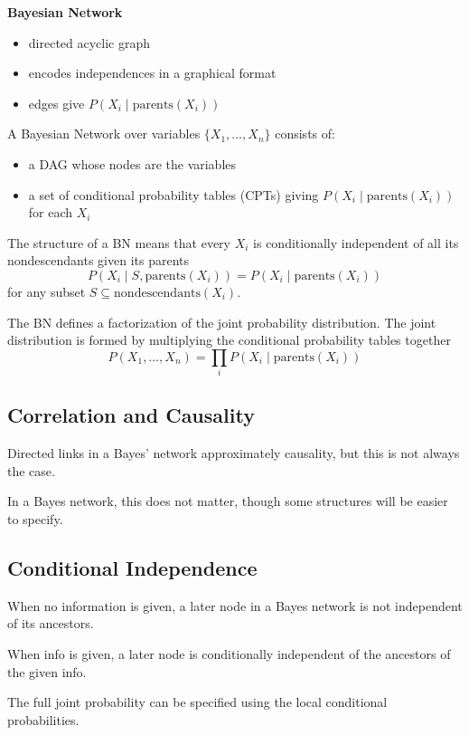 \documentclass[11pt]{article}
\begin{document}
\textbf{Bayesian Network}
\begin{itemize}
\item directed acyclic graph
\item encodes independences in a graphical format
\item edges give \(P(X_{i} \mid \text{parents}(X_{i}))\)
\end{itemize}

A Bayesian Network over variables \(\{ X_{1}, \dots, X_{n} \}\) consists of:
\begin{itemize}
\item a DAG whose nodes are the variables
\item a set of conditional probability tables (CPTs) giving \(P(X_{i} \mid \text{parents}(X_{i}))\)
for each \(X_{i}\)
\end{itemize}

The structure of a BN means that
every \(X_{i}\) is conditionally independent of all its nondescendants given its parents
$$ P(X_{i} \mid S, \text{parents}(X_{i})) = P(X_{i} \mid \text{parents}(X_{i})) $$
for any subset \(S \subseteq \text{nondescendants}(X_{i})\).

The BN defines a factorization of the joint probability distribution.
The joint distribution is formed by multiplying the conditional probability tables together
$$ P(X_{1}, \dots, X_{n}) = \prod_{i} P(X_{i} \mid \text{parents}(X_{i})) $$
\subsection{Correlation and Causality}
\label{sec:orge5d0bfa}
Directed links in a Bayes' network approximately causality, but this is not always the case.

In a Bayes network, this does not matter, though some structures will be easier to specify.
\subsection{Conditional Independence}
\label{sec:org83b2b89}
When no information is given, a later node in a Bayes network is not independent of its
ancestors.

When info is given, a later node is conditionally independent of the ancestors of the given info.

The full joint probability can be specified using the local conditional probabilities.
\end{document}
